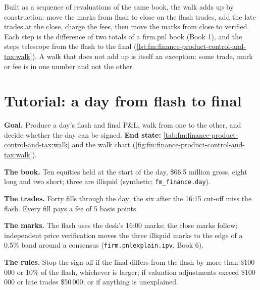 Built as a sequence of revaluations of the same book, the walk adds up by construction: move the marks from flash to close on the flash trades, add
the late trades at the close, charge the fees, then move the marks from close to verified. Each step is the difference of two totals of a firm.pnl
book (Book 1), and the steps telescope from the flash to the final (\cref{lst:fm:finance-product-control-and-tax:walk}). A walk that does not add
up is itself an exception: some trade, mark or fee is in one number and not the other.

\label{lst:fm:finance-product-control-and-tax:walk}

\section{Tutorial: a day from flash to final}\label{tut:fm:finance-product-control-and-tax:tut}

\begin{tutorial}
\textbf{Goal.} Produce a day's flash and final P\&L, walk from one to the other, and decide whether the day can be signed. \textbf{End state:}
\cref{tab:fm:finance-product-control-and-tax:walk} and the walk chart (\cref{fig:fm:finance-product-control-and-tax:walk}).
\begin{tutsteps}
\item \textbf{The book.} Ten equities held at the start of the day, \$66.5 million gross, eight long and two short; three are illiquid
(synthetic; \texttt{fm\_finance.day}).
\item \textbf{The trades.} Forty fills through the day; the six after the 16:15 cut-off miss the flash. Every fill pays a fee of 5 basis points.
\item \textbf{The marks.} The flash uses the desk's 16:00 marks; the close marks follow; independent price verification moves the three illiquid
marks to the edge of a 0.5\% band around a consensus (\texttt{firm.pnlexplain.ipv}, Book 6).
\item \textbf{The rules.} Stop the sign-off if the final differs from the flash by more than \$100\,000 or 10\% of the flash, whichever is larger;
if valuation adjustments exceed \$100\,000 or late trades \$50\,000; or if anything is unexplained.
\end{tutsteps}
\end{tutorial}

